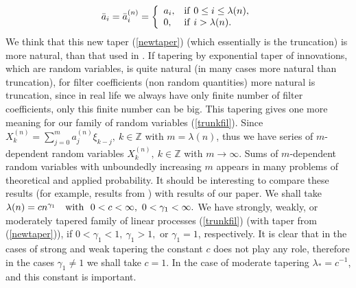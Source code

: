 \documentclass[12pt]{article}
\def\bz{{\bf Z}}
\def\bz{{\mathbb Z}} %
\def\g{\gamma}
\def\l{\lambda}
\theoremstyle{plain}
\theoremstyle{definition}
\begin{document}
\begin{equation}\label{newtaper}
{\bar a}_i= {\bar a}_i^{(n)}=\left \{\begin{array}{ll}
              a_i, & {\rm if} \ 0\le i\le \l(n), \\
              0, & {\rm if} \ i> \l(n).
               \end{array} \right.
\end{equation}
We think that this new taper (\ref{newtaper}) (which essentially is the truncation) is more natural, than that used in \cite{Sabzikar}. If tapering by exponential taper of innovations, which are random variables,  is quite natural (in many cases more natural than truncation), for filter coefficients (non random quantities) more natural is truncation, since in real life we always have only finite number of filter coefficients, only this finite number can be big. This tapering gives one more meaning for our family of random variables (\ref{trunkfil}). Since $X_k^{(n)}=\sum_{j=0}^m a_j^{(n)}\xi_{k-j}, \ k\in \bz$ with $m=\l(n)$, thus we have series of $m$-dependent random variables $X_k^{(n)}, \ k\in \bz$ with $m \to \infty$. Sums of $m$-dependent random variables with unboundedly increasing $m$ appears in many problems of theoretical and applied probability. It should  be interesting to compare these results (for example, results from \cite{Romano}) with results of our paper.
%
 We shall take $\l(n)=cn^{\g_1} \quad {\rm with}\ \ 0<c<\infty, \ 0<\g_1<\infty.$
We have strongly, weakly, or moderately tapered family of linear processes (\ref{trunkfil}) (with taper from (\ref{newtaper})), if $0<\g_1<1, \ \g_1>1,$ or $\g_1=1$, respectively. It is clear that in the cases of strong and weak tapering the constant $c$ does not play any role, therefore in the cases $\g_1\ne 1$ we shall take $c=1$. In the case of moderate tapering  $\l_*=c^{-1}$, and this constant is important.
\end{document}
